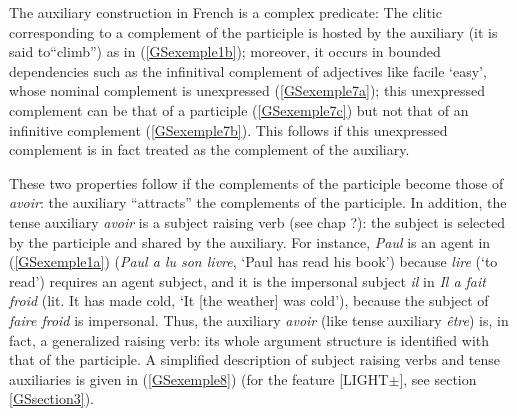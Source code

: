 \documentclass[output=paper]{langsci/langscibook}
\begin{document}
{The auxiliary construction in French is a complex predicate: The clitic corresponding to a complement of the participle is hosted by the auxiliary (it is said to``climb'') as in (\ref{GSexemple1b}); moreover, it occurs in bounded dependencies such as the infinitival complement of adjectives like facile `easy', whose nominal complement is unexpressed (\ref{GSexemple7a}); this unexpressed complement can be that of a participle (\ref{GSexemple7c}) but not that of an infinitive complement (\ref{GSexemple7b}). This follows if this unexpressed complement is in fact treated as the complement of the auxiliary.


\begin{exe}
	\ex \label{GSexemple7}
	\begin{xlist}
		
		 \label{GSexemple7a}
		
		 \label{GSexemple7b}
		
		 \label{GSexemple7c}
		

	\end{xlist}
\end{exe}

These two properties follow if the complements of the participle become those of \textit{avoir}: the auxiliary ``attracts'' the complements of the participle. In addition, the tense auxiliary \textit{avoir} is a subject raising verb (see chap ?): the subject is selected by the participle and shared by the auxiliary. For instance, \textit{Paul} is an agent in (\ref{GSexemple1a}) (\textit{Paul a lu son livre}, `Paul has read his book') because \textit{lire} (`to read') requires an agent subject, and it is the impersonal subject \textit{il} in \textit{Il a fait froid} (lit. It has made cold, `It [the weather] was cold'), because the subject of \textit{faire froid} is impersonal. Thus, the auxiliary \textit{avoir} (like tense auxiliary \textit{\^etre}) is, in fact, a generalized raising verb: its whole argument structure is identified with that of the participle. A simplified description of subject raising verbs and tense auxiliaries is given in (\ref{GSexemple8}) (for the feature [LIGHT$\pm$], see section \ref{GSsection3}).

}
\end{document}
